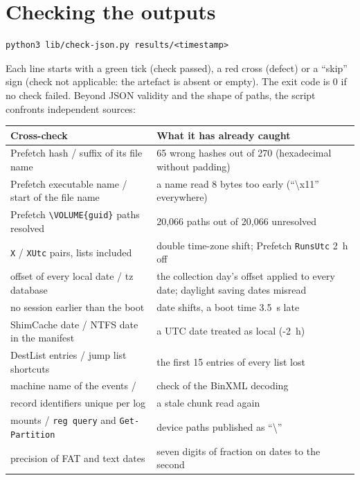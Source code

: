 \documentclass[11pt,a4paper,oneside]{report}
\begin{document}
\section{Checking the outputs}

\begin{lstlisting}
python3 lib/check-json.py results/<timestamp>
\end{lstlisting}

Each line starts with a green tick (check passed), a red cross (defect) or a
``skip'' sign (check not applicable: the artefact is absent or empty). The exit
code is 0 if no check failed. Beyond JSON validity and the shape of paths, the
script confronts independent sources:

\begin{longtable}{@{}L{6.6cm}L{8.4cm}@{}}
\toprule
\textbf{Cross-check} & \textbf{What it has already caught} \\
\midrule
\endhead
Prefetch hash / suffix of its file name & 65 wrong hashes out of 270 (hexadecimal without padding) \\
Prefetch executable name / start of the file name & a name read 8 bytes too early (``\textbackslash x11'' everywhere) \\
Prefetch \texttt{\textbackslash VOLUME\{guid\}} paths resolved & 20,066 paths out of 20,066 unresolved \\
\texttt{X} / \texttt{XUtc} pairs, lists included & double time-zone shift; Prefetch \texttt{RunsUtc} 2~h off \\
offset of every local date / tz database & the collection day's offset applied to every date; daylight saving dates misread \\
no session earlier than the boot & date shifts, a boot time 3.5~s late \\
ShimCache date / NTFS date in the manifest & a UTC date treated as local (-2~h) \\
DestList entries / jump list shortcuts & the first 15 entries of every list lost \\
machine name of the events /  & check of the BinXML decoding \\
record identifiers unique per log & a stale chunk read again \\
mounts / \texttt{reg query} and \texttt{Get-Partition} & device paths published as ``\textbackslash{}'' \\
precision of FAT and text dates & seven digits of fraction on dates to the second \\

\end{longtable}
\end{document}

